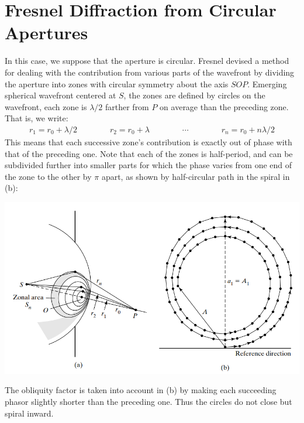 \documentclass[11pt]{book}
\theoremstyle{break}
\theoremstyle{break}
\begin{document}
\section{Fresnel Diffraction from Circular Apertures}
In this case, we suppose that the aperture is circular. Fresnel devised a method for dealing with the contribution from various parts of the wavefront by dividing the aperture into zones with circular symmetry about the axis $SOP$. Emerging spherical wavefront centered at $S$, the zones are defined by circles on the wavefront, each zone is $\lambda/2$ farther from $P$ on average than the preceding zone. That is, we write:
\begin{align*}
r_1 = r_0 + \lambda/2 \qquad\qquad r_2 = r_0 +\lambda	 \qquad\qquad \cdots\qquad\qquad r_n = r_0 +n\lambda/2
\end{align*}
This means that each successive zone's contribution is exactly out of phase with that of the preceding one. Note that each of the zones is half-period, and can be subdivided further into smaller parts for which the phase varies from one end of the zone to the other by $\pi$ apart, as shown by half-circular path in the spiral in (b):
\begin{center}
\includegraphics[scale=0.8]{zones}
\end{center}
The obliquity factor is taken into account in (b) by making each succeeding phasor slightly shorter than the preceding
one. Thus the circles do not close but spiral inward.\\
\end{document}
